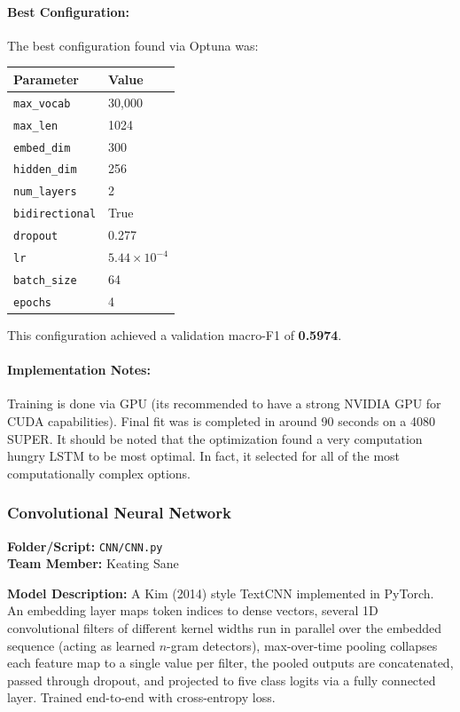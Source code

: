 \documentclass[12pt]{article}
\begin{document}
\paragraph{Best Configuration:}
The best configuration found via Optuna was:

\begin{table}[H]
    \centering
    \begin{tabular}{ll}
        \toprule
        Parameter & Value \\
        \midrule
        \texttt{max\_vocab} & 30{,}000 \\
        \texttt{max\_len} & 1024 \\
        \texttt{embed\_dim} & 300 \\
        \texttt{hidden\_dim} & 256 \\
        \texttt{num\_layers} & 2 \\
        \texttt{bidirectional} & True \\
        \texttt{dropout} & 0.277 \\
        \texttt{lr} & $5.44 \times 10^{-4}$ \\
        \texttt{batch\_size} & 64 \\
        \texttt{epochs} & 4 \\
        \bottomrule
    \end{tabular}
\end{table}

This configuration achieved a validation macro-F1 of \textbf{0.5974}.

\paragraph{Implementation Notes:}
Training is done via GPU (its recommended to have a strong NVIDIA GPU for CUDA capabilities). Final fit was is completed in around 90 seconds on a 4080 SUPER. It should be noted that the optimization found a very computation hungry LSTM to be most optimal. In fact, it selected for all of the most computationally complex options.

\newpage

\subsubsection{Convolutional Neural Network}
\textbf{Folder/Script:} \texttt{CNN/CNN.py}\\
\textbf{Team Member:} Keating Sane

\textbf{Model Description:} A Kim (2014) style TextCNN implemented in PyTorch. An embedding layer maps token indices to dense vectors, several 1D convolutional filters of different kernel widths run in parallel over the embedded sequence (acting as learned $n$-gram detectors), max-over-time pooling collapses each feature map to a single value per filter, the pooled outputs are concatenated, passed through dropout, and projected to five class logits via a fully connected layer. Trained end-to-end with cross-entropy loss.
\end{document}
